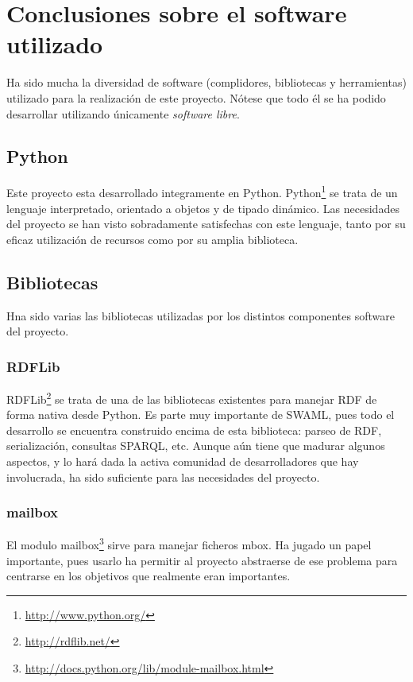 
\section{Conclusiones sobre el software utilizado}

Ha sido mucha la diversidad de software (complidores, bibliotecas y herramientas)
utilizado para la realización de este proyecto. Nótese que todo él se ha podido
desarrollar utilizando únicamente \emph{software libre}.

\subsection{Python}

Este proyecto esta desarrollado integramente en Python. Python\footnote{\url{http://www.python.org/}}
se trata de un lenguaje interpretado, orientado a objetos y de tipado dinámico.
Las necesidades del proyecto se han visto sobradamente satisfechas con este lenguaje,
tanto por su eficaz utilización de recursos como por su amplia biblioteca. 

\subsection{Bibliotecas\label{sec:conclu:bib}}

Hna sido varias las bibliotecas utilizadas por los distintos componentes software
del proyecto.

\subsubsection{RDFLib}

RDFLib\footnote{\url{http://rdflib.net/}} se trata de una de las bibliotecas
existentes para manejar RDF de forma nativa desde Python. Es parte muy 
importante de SWAML, pues todo el desarrollo se encuentra construido encima 
de esta biblioteca: parseo de RDF, serialización, consultas SPARQL, etc. Aunque 
aún tiene que madurar algunos aspectos, y lo hará dada la activa comunidad de
desarrolladores que hay involucrada, ha sido suficiente para las necesidades
del proyecto.

\subsubsection{mailbox}

El modulo mailbox\footnote{\url{http://docs.python.org/lib/module-mailbox.html}}
sirve para manejar ficheros mbox. Ha jugado un papel importante, pues usarlo
ha permitir al proyecto abstraerse de ese problema para centrarse en los
objetivos que realmente eran importantes.

